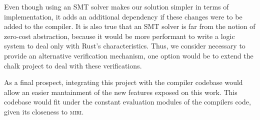 Even though using an SMT solver makes our solution simpler in terms of
implementation, it adds an additional dependency if these changes were to be
added to the compiler. It is also true that an SMT solver is far from the
notion of zero-cost abstraction, because it would be more performant to write a
logic system to deal only with Rust's characteristics. Thus, we consider
necessary to provide an alternative verification mechanism, one option would be
to extend the chalk project to deal with these verifications.

As a final prospect, integrating this project with the compiler codebase would
allow an easier mantainment of the new features exposed on this work. This
codebase would fit under the constant evaluation modules of the compilers code,
given its closeness to \textsc{miri}.
